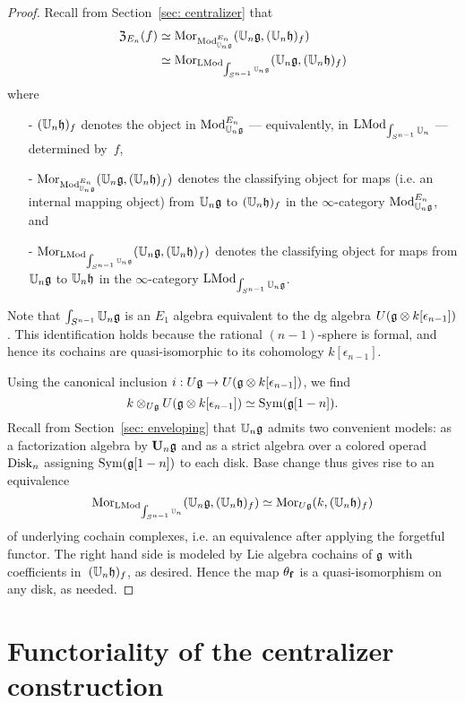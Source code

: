 \documentclass[11pt]{amsart}
\numberwithin{equation}{section}
\begin{document}
\begin{proof}
Recall from Section~\ref{sec: centralizer} that 
\begin{align*}
{\frak Z}_{E_n}(f) &\simeq {{\rm Mor}}_{{\rm Mod}^{E_n}_{\mathbb U_n\mathfrak g}}(\mathbb U_n \mathfrak g, (\mathbb U_n \mathfrak h)_f) \\
&\simeq {\rm Mor}_{{\rm LMod}_{\int_{S^{n-1}} \mathbb U_n\mathfrak g}}(\mathbb U_n \mathfrak g, (\mathbb U_n \mathfrak h)_f)
\end{align*}
where 
\begin{itemize}
\item[-] $(\mathbb U_n \mathfrak h)_f$ denotes the object in ${\rm Mod}^{E_n}_{\mathbb U_n\mathfrak g}$ --- equivalently, in ${\rm LMod}_{\int_{S^{n-1}}\mathbb U_n}$ --- determined by~$f$, 
\item[-] ${\rm Mor}_{{\rm Mod}^{E_n}_{\mathbb U_n\mathfrak g}}(\mathbb U_n \mathfrak g, (\mathbb U_n \mathfrak h)_f)$ denotes the classifying object for maps (i.e. an internal mapping object) from $\mathbb U_n\mathfrak g$ to $(\mathbb U_n \mathfrak h)_f$ in the $\infty$-category ${\rm Mod}^{E_n}_{\mathbb U_n\mathfrak g}$, and
\item[-] ${\rm Mor}_{{\rm LMod}_{\int_{S^{n-1}} \mathbb U_n\mathfrak g}} (\mathbb U_n \mathfrak g, (\mathbb U_n \mathfrak h)_f)$ denotes the classifying object for maps from ${\mathbb U_n\mathfrak g}$ to $\mathbb U_n \mathfrak h$ in the $\infty$-category ${\rm LMod}_{\int_{S^{n-1}}\mathbb U_n\mathfrak g}$. 
\end{itemize}
Note that $\int_{S^{n-1}}\mathbb U_n\mathfrak g$ is an $E_1$ algebra equivalent to the dg algebra $U(\mathfrak g \otimes k[\epsilon_{n-1}])$.
This identification holds because the rational $(n-1)$-sphere is formal, and hence its cochains are quasi-isomorphic to its cohomology $k[\epsilon_{n-1}]$. 
 
Using the canonical inclusion $i: U\mathfrak g \to U(\mathfrak g \otimes k[\epsilon_{n-1}])$,
we find
\[
k \otimes_{U\mathfrak g} U(\mathfrak g \otimes k[\epsilon_{n-1}]) \simeq {\rm Sym}(\mathfrak g[1-n]).
\]
Recall from Section~\ref{sec: enveloping} that $\mathbb U_n \mathfrak g$ admits two convenient models:
as a factorization algebra by $\mathbf U_n \mathfrak g$ and as a strict algebra over a colored operad ${\rm Disk}_n$ assigning ${\rm Sym}(\mathfrak g[1-n])$ to each disk.
Base change thus gives rise to an equivalence 
\[
{\rm Mor}_{{\rm LMod}_{\int_{S^{n-1}} \mathbb U_n}} (\mathbb U_n \mathfrak g, (\mathbb U_n \mathfrak h)_f)  \simeq {\rm Mor}_{U\mathfrak g} (k, (\mathbb U_n \mathfrak h)_f)
\]
of underlying cochain complexes, i.e. an equivalence after applying the forgetful functor. 
The right hand side is modeled by Lie algebra cochains of $\mathfrak g$ with coefficients in~$(\mathbb U_n \mathfrak h)_f$, as desired.
Hence the map $\theta_{\bf f}$ is a quasi-isomorphism on any disk, as needed.
\end{proof}

\section{Functoriality of the centralizer construction}
\label{S:centerinFacAlg}
\end{document}
